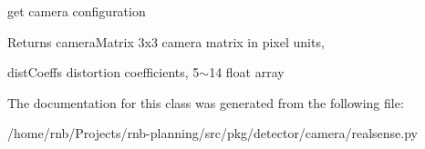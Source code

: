 get camera configuration 

\begin{DoxyReturn}{Returns}
camera\+Matrix 3x3 camera matrix in pixel units, 

dist\+Coeffs distortion coefficients, 5$\sim$14 float array 
\end{DoxyReturn}


The documentation for this class was generated from the following file\+:\begin{DoxyCompactItemize}
\item 
/home/rnb/\+Projects/rnb-\/planning/src/pkg/detector/camera/realsense.\+py\end{DoxyCompactItemize}
